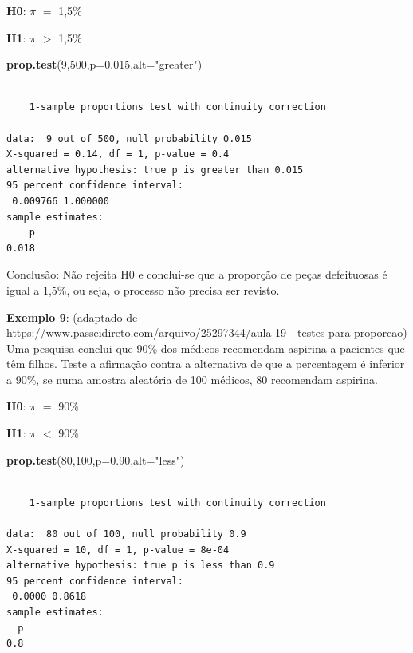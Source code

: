 \documentclass[12pt,portuguese,oneside]{book}
\newenvironment{Shaded}{\begin{snugshade}}{\end{snugshade}}
\newcommand{\KeywordTok}[1]{\textcolor[rgb]{0.13,0.29,0.53}{\textbf{#1}}}
\newcommand{\DataTypeTok}[1]{\textcolor[rgb]{0.13,0.29,0.53}{#1}}
\newcommand{\DecValTok}[1]{\textcolor[rgb]{0.00,0.00,0.81}{#1}}
\newcommand{\FloatTok}[1]{\textcolor[rgb]{0.00,0.00,0.81}{#1}}
\newcommand{\StringTok}[1]{\textcolor[rgb]{0.31,0.60,0.02}{#1}}
\newcommand{\NormalTok}[1]{#1}
\begin{document}
\textbf{H0}: \(\pi\) \(=\) 1,5\%

\textbf{H1}: \(\pi\) \(>\) 1,5\%

\begin{Shaded}
\begin{Highlighting}[]
\KeywordTok{prop.test}\NormalTok{(}\DecValTok{9}\NormalTok{,}\DecValTok{500}\NormalTok{,}\DataTypeTok{p=}\FloatTok{0.015}\NormalTok{,}\DataTypeTok{alt=}\StringTok{"greater"}\NormalTok{)}
\end{Highlighting}
\end{Shaded}

\begin{verbatim}

    1-sample proportions test with continuity correction

data:  9 out of 500, null probability 0.015
X-squared = 0.14, df = 1, p-value = 0.4
alternative hypothesis: true p is greater than 0.015
95 percent confidence interval:
 0.009766 1.000000
sample estimates:
    p 
0.018 
\end{verbatim}

Conclusão: Não rejeita H0 e conclui-se que a proporção de peças
defeituosas é igual a 1,5\%, ou seja, o processo não precisa ser
revisto.

\textbf{Exemplo 9}: (adaptado de
\url{https://www.passeidireto.com/arquivo/25297344/aula-19---testes-para-proporcao})
Uma pesquisa conclui que 90\% dos médicos recomendam aspirina a
pacientes que têm filhos. Teste a afirmação contra a alternativa de que
a percentagem é inferior a 90\%, se numa amostra aleatória de 100
médicos, 80 recomendam aspirina.

\textbf{H0}: \(\pi\) \(=\) 90\%

\textbf{H1}: \(\pi\) \(<\) 90\%

\begin{Shaded}
\begin{Highlighting}[]
\KeywordTok{prop.test}\NormalTok{(}\DecValTok{80}\NormalTok{,}\DecValTok{100}\NormalTok{,}\DataTypeTok{p=}\FloatTok{0.90}\NormalTok{,}\DataTypeTok{alt=}\StringTok{"less"}\NormalTok{)}
\end{Highlighting}
\end{Shaded}

\begin{verbatim}

    1-sample proportions test with continuity correction

data:  80 out of 100, null probability 0.9
X-squared = 10, df = 1, p-value = 8e-04
alternative hypothesis: true p is less than 0.9
95 percent confidence interval:
 0.0000 0.8618
sample estimates:
  p 
0.8 
\end{verbatim}
\end{document}
